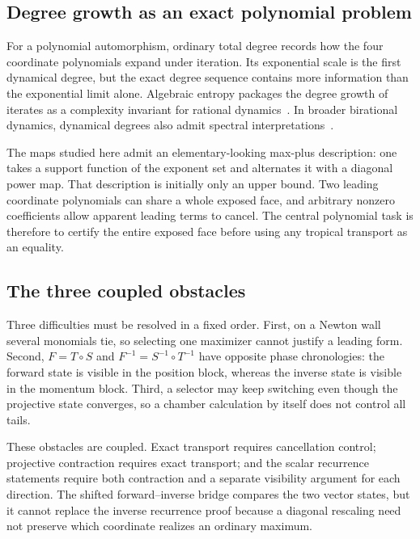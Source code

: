 \documentclass[11pt]{article}
\theoremstyle{definition}
\theoremstyle{remark}
\begin{document}
\subsection{Degree growth as an exact polynomial problem}

For a polynomial automorphism, ordinary total degree records how the four
coordinate polynomials expand under iteration.  Its exponential scale is
the first dynamical degree, but the exact degree sequence contains more
information than the exponential limit alone.  Algebraic entropy packages
the degree growth of iterates as a complexity invariant for rational
dynamics~\cite{BellonViallet1999AlgebraicEntropy}.  In broader birational
dynamics, dynamical degrees also admit spectral
interpretations~\cite{DangFavre2021SpectralInterpretations}.

The maps studied here admit an elementary-looking max-plus description:
one takes a support function of the exponent set and alternates it with a
diagonal power map.  That description is initially only an upper bound.
Two leading coordinate polynomials can share a whole exposed face, and
arbitrary nonzero coefficients allow apparent leading terms to cancel.  The central
polynomial task is therefore to certify the entire exposed face before
using any tropical transport as an equality.

\subsection{The three coupled obstacles}

Three difficulties must be resolved in a fixed order.  First, on a Newton
wall several monomials tie, so selecting one maximizer cannot justify a
leading form.  Second, \(F=T\circ S\) and
\(F^{-1}=S^{-1}\circ T^{-1}\) have opposite phase chronologies: the
forward state is visible in the position block, whereas the inverse state
is visible in the momentum block.  Third, a selector may keep switching
even though the projective state converges, so a chamber calculation by
itself does not control all tails.

These obstacles are coupled.  Exact transport requires cancellation
control; projective contraction requires exact transport; and the scalar
recurrence statements require both contraction and a separate visibility
argument for each direction.  The shifted forward--inverse bridge compares
the two vector states, but it cannot replace the inverse recurrence proof
because a diagonal rescaling need not preserve which coordinate realizes
an ordinary maximum.
\end{document}
